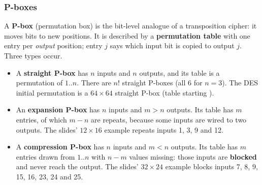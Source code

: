 \subsubsection*{P-boxes \hot}
A \textbf{P-box} (permutation box) is the bit-level analogue of a transposition cipher: it moves bits to new positions. It is described by a \textbf{permutation table} with one entry per \emph{output} position; entry $j$ says which input bit is copied to output $j$. Three types occur.
\begin{itemize}
  \item A \textbf{straight P-box} has $n$ inputs and $n$ outputs, and its table is a permutation of $1..n$. There are $n!$ straight P-boxes (all 6 for $n = 3$). The DES initial permutation is a $64 \times 64$ straight P-box (table starting ).
  \item An \textbf{expansion P-box} has $n$ inputs and $m > n$ outputs. Its table has $m$ entries, of which $m - n$ are repeats, because some inputs are wired to two outputs. The slides' $12 \times 16$ example  repeats inputs 1, 3, 9 and 12.
  \item A \textbf{compression P-box} has $n$ inputs and $m < n$ outputs. Its table has $m$ entries drawn from $1..n$ with $n - m$ values missing: those inputs are \textbf{blocked} and never reach the output. The slides' $32 \times 24$ example blocks inputs 7, 8, 9, 15, 16, 23, 24 and 25.
\end{itemize}
